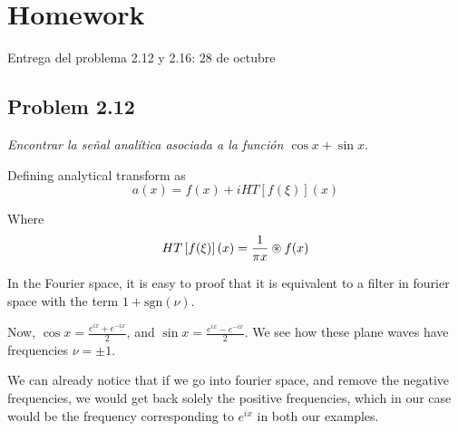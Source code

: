 \documentclass[../main/main.tex]{subfiles}
\begin{document}
\setcounter{chapter}{4}
\setcounter{section}{0}
\section{Homework}

Entrega del problema 2.12 y 2.16: 28 de octubre




\subsection*{Problem 2.12}
\emph{Encontrar la señal analítica asociada a la función $\cos x +\sin x$}.

Defining analytical transform as
\begin{equation}
	a(x) = f(x) + i HT\left[f(\xi)\right](x)
\end{equation}

Where
\begin{equation}
	HT\left[f(\xi)\right](x) = \frac{1}{\pi x} \circledast f(x)
\end{equation}

In the Fourier space, it is easy to proof that it is equivalent to a filter in fourier space with the term $1 + \textrm{sgn}(\nu)$.

Now, $\cos x = \frac{e^{i x} + e^{-ix}}{2}$, and
$\sin x = \frac{e^{i x} - e^{-ix}}{2}$. We see how these plane waves have frequencies $\nu=\pm 1$.

We can already notice that if we go into fourier space, and remove the negative frequencies, we would get back solely the positive frequencies, which in our case would be the frequency corresponding to $e^{ix}$ in both our examples.
\end{document}
